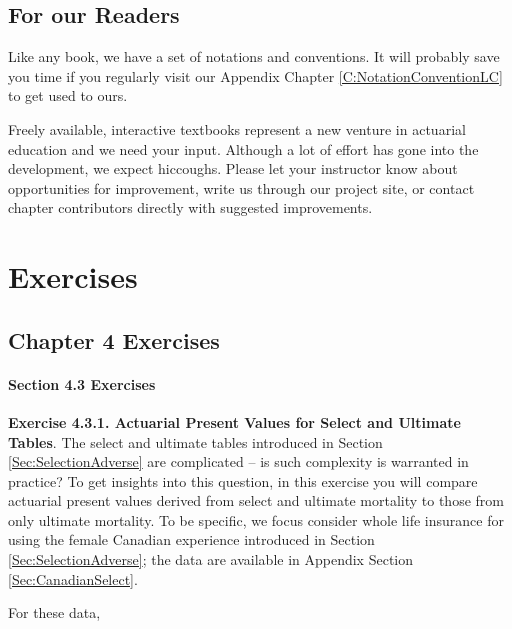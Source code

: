 \documentclass[
]{book}
\begin{document}
\hypertarget{for-our-readers}{%
\section*{For our Readers}\label{for-our-readers}}

Like any book, we have a set of notations and conventions. It will probably save you time if you regularly visit our Appendix Chapter \ref{C:NotationConventionLC} to get used to ours.

Freely available, interactive textbooks represent a new venture in actuarial education and we need your input. Although a lot of effort has gone into the development, we expect hiccoughs. Please let your instructor know about opportunities for improvement, write us through our project site, or contact chapter contributors directly with suggested improvements.

\hypertarget{exercises}{%
\chapter{Exercises}\label{exercises}}

\hypertarget{chapter-4-exercises}{%
\section{Chapter 4 Exercises}\label{chapter-4-exercises}}

\hypertarget{section-4.3-exercises}{%
\subsubsection*{Section 4.3 Exercises}\label{section-4.3-exercises}}

\textbf{Exercise 4.3.1. Actuarial Present Values for Select and Ultimate Tables}. The select and ultimate tables introduced in Section \ref{Sec:SelectionAdverse} are complicated -- is such complexity is warranted in practice? To get insights into this question, in this exercise you will compare actuarial present values derived from select and ultimate mortality to those from only ultimate mortality. To be specific, we focus consider whole life insurance for using the female Canadian experience introduced in Section \ref{Sec:SelectionAdverse}; the data are available in Appendix Section \ref{Sec:CanadianSelect}.

For these data,
\end{document}
